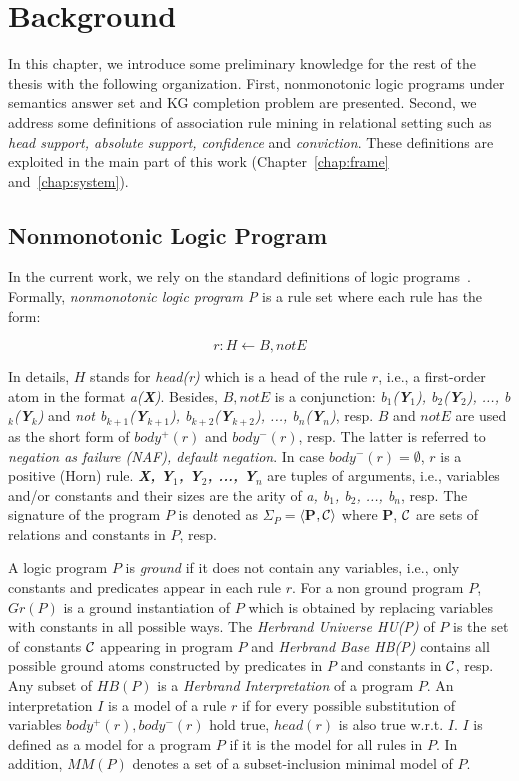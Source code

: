 \chapter{Background}
\label{chap:back}

In this chapter, we introduce some preliminary knowledge for the rest of the thesis with the following organization. First, nonmonotonic logic programs under semantics answer set and KG completion problem are presented. Second, we address some definitions of association rule mining in relational setting such as \textit{head support, absolute support, confidence} and \textit{conviction}. These definitions are exploited in the main part of this work (Chapter~\ref{chap:frame} and~\ref{chap:system}).

\section{Nonmonotonic Logic Program}

In the current work, we rely on the standard definitions of logic programs~\cite{ref49}. Formally, \textit{nonmonotonic logic program P} is a rule set where each rule has the form:

\begin{equation}
r: H \leftarrow B, not E
\end{equation}
\label{rule3}

In details, $H$ stands for \textit{head(r)} which is a head of the rule $r$, i.e., a first-order atom in the format \textit{a(\textbf{X})}. Besides, $B, not E$ is a conjunction: \textit{b$_1$(\textbf{Y}$_1$), b$_2$(\textbf{Y}$_2$), ..., b$_k$(\textbf{Y}$_k$)} and \textit{not b$_{k+1}$(\textbf{Y}$_{k+1}$), b$_{k+2}$(\textbf{Y}$_{k+2}$), ..., b$_n$(\textbf{Y}$_n$)}, resp. $B$ and $not E$ are used as the short form of $body^+(r)$ and $body^-(r)$, resp. The latter is referred to \textit{negation as failure (NAF), default negation}. In case $body^-(r) = \emptyset$, $r$ is a positive (Horn) rule. \textit{\textbf{X, Y$_{1}$, Y$_{2}$, ..., Y$_{n}$}} are tuples of arguments, i.e., variables and/or constants and their sizes are the arity of \textit{a, b$_1$, b$_2$, ..., b$_n$}, resp. The signature of the program $P$ is denoted as $\Sigma_{P} = \langle$\textbf{P}$, \mathcal{C}\rangle$ where \textbf{P}, $\mathcal{C}$ are sets of relations and constants in $P$, resp.

A logic program $P$ is \textit{ground} if it does not contain any variables, i.e., only constants and predicates appear in each rule $r$. For a non ground program $P$, $Gr(P)$ is a ground instantiation of $P$ which is obtained by replacing variables with constants in all possible ways. The \textit{Herbrand Universe HU(P)} of $P$ is the set of constants $\mathcal{C}$ appearing in program $P$ and \textit{Herbrand Base HB(P)} contains all possible ground atoms constructed by predicates in $P$ and constants in $\mathcal{C}$, resp. Any subset of $HB(P)$ is a \textit{Herbrand Interpretation} of a program $P$. An interpretation $I$ is a model of a rule $r$ if for every possible substitution of variables $body^+(r), body^-(r)$ hold true, $head(r)$ is also true w.r.t. $I$. $I$ is defined as a model for a program $P$ if it is the model for all rules in $P$. In addition, $MM(P)$ denotes a set of a subset-inclusion minimal model of $P$.

